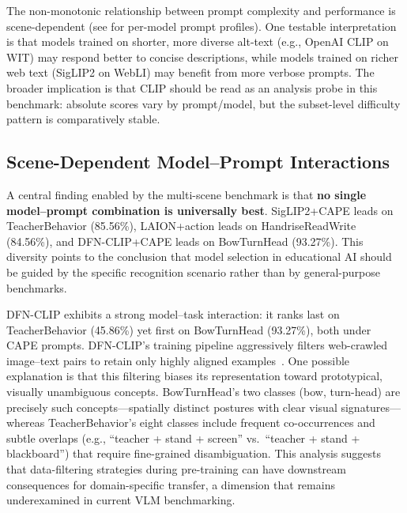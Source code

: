 \documentclass[symmetry,article,submit,pdftex,moreauthors]{Definitions/mdpi}
\begin{document}
The non-monotonic relationship between prompt complexity and performance is scene-dependent (see  for per-model prompt profiles).
One testable interpretation is that models trained on shorter, more diverse alt-text (e.g., OpenAI CLIP on WIT) may respond better to concise descriptions, while models trained on richer web text (SigLIP2 on WebLI) may benefit from more verbose prompts.
The broader implication is that CLIP should be read as an analysis probe in this benchmark: absolute scores vary by prompt/model, but the subset-level difficulty pattern is comparatively stable.

\subsection{Scene-Dependent Model--Prompt Interactions}

A central finding enabled by the multi-scene benchmark is that \textbf{no single model--prompt combination is universally best}.
SigLIP2+CAPE leads on TeacherBehavior (85.56\%), LAION+action leads on HandriseReadWrite (84.56\%), and DFN-CLIP+CAPE leads on BowTurnHead (93.27\%).
This diversity points to the conclusion that model selection in educational AI should be guided by the specific recognition scenario rather than by general-purpose benchmarks.

DFN-CLIP exhibits a strong model--task interaction: it ranks last on TeacherBehavior (45.86\%) yet first on BowTurnHead (93.27\%), both under CAPE prompts.
DFN-CLIP's training pipeline aggressively filters web-crawled image--text pairs to retain only highly aligned examples~\cite{fang2023data}. One possible explanation is that this filtering biases its representation toward prototypical, visually unambiguous concepts.
BowTurnHead's two classes (bow, turn-head) are precisely such concepts---spatially distinct postures with clear visual signatures---whereas TeacherBehavior's eight classes include frequent co-occurrences and subtle overlaps (e.g., ``teacher + stand + screen'' vs.\ ``teacher + stand + blackboard'') that require fine-grained disambiguation.
This analysis suggests that data-filtering strategies during pre-training can have downstream consequences for domain-specific transfer, a dimension that remains underexamined in current VLM benchmarking.
\end{document}
